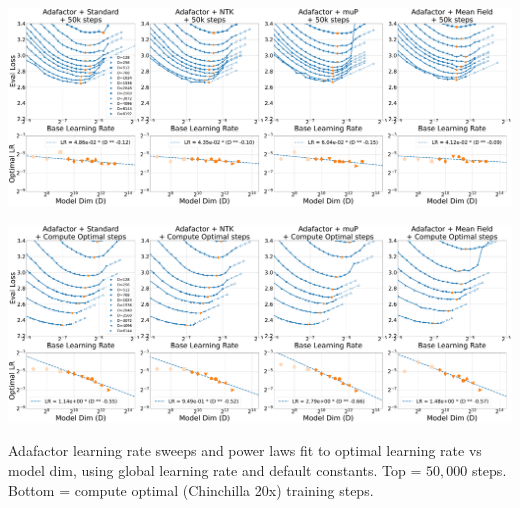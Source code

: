 \documentclass{article}
\theoremstyle{plain}
\theoremstyle{definition}
\theoremstyle{remark}
\begin{document}
\thispagestyle{plain}
\begin{SidewaysFigure}
\\
\includegraphics[width=0.98\linewidth]{icml2024/figures/lr_sweeps/compute_opt_appendix/adafactor+50k_steps.pdf}

\figvspace

\includegraphics[width=0.98\linewidth]{icml2024/figures/lr_sweeps/compute_opt_appendix/adafactor+compute_opt.pdf}
\caption{Adafactor learning rate sweeps and power laws fit to optimal learning rate vs model dim, using global learning rate and default constants. Top = $50{,}000$ steps. Bottom = compute optimal (Chinchilla 20x) training steps.}
\label{fig:app_compute_opt_adafactor}
\end{SidewaysFigure}
\clearpage
\end{document}
